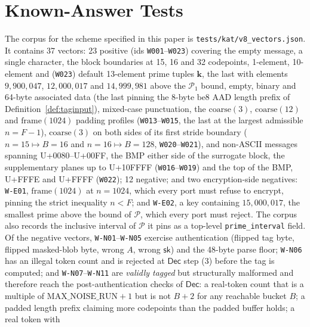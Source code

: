 \documentclass[11pt,a4paper]{article}
\begin{document}
\section{Known-Answer Tests}
\label{sec:kats}

The corpus for the scheme specified in this paper is
\texttt{tests/kat/v8\_vectors.json}. It contains 37 vectors: 23 positive
(ids \texttt{W001}--\texttt{W023}) covering the empty message, a single
character, the block boundaries at 15, 16 and 32 codepoints, 1-element,
10-element and (\texttt{W023}) default 13-element prime tuples
$\mathbf{k}$, the last with elements $9{,}900{,}047$, $12{,}000{,}017$
and $14{,}999{,}981$ above the $\mathcal{P}_1$ bound, empty, binary and 64-byte associated
data (the last pinning the 8-byte $\mathrm{be8}$ AAD length prefix of
Definition~\ref{def:taginput}), mixed-case punctuation, the
$\mathrm{coarse}(3)$, $\mathrm{coarse}(12)$ and $\mathrm{frame}(1024)$
padding profiles (\texttt{W013}--\texttt{W015}, the last at the largest
admissible $n=F-1$), $\mathrm{coarse}(3)$ on both sides of its first
stride boundary ($n=15\mapsto B=16$ and $n=16\mapsto B=128$,
\texttt{W020}--\texttt{W021}), and non-ASCII messages
spanning U+0080--U+00FF, the BMP either side of the surrogate block, the
supplementary planes up to U+10FFFF (\texttt{W016}--\texttt{W019}) and the
top of the BMP, U+FFFE and U+FFFF (\texttt{W022}); 12
negative; and two encryption-side negatives: \texttt{W-E01},
$\mathrm{frame}(1024)$ at $n=1024$, which every port must refuse to
encrypt, pinning the strict inequality $n<F$; and \texttt{W-E02}, a key
containing $15{,}000{,}017$, the smallest prime above the bound of
$\mathcal{P}$, which every port must reject. The corpus also records the
inclusive interval of $\mathcal{P}$ it pins as a top-level
\texttt{prime\_interval} field.
Of the negative vectors, \texttt{W-N01}--\texttt{W-N05} exercise
authentication (flipped tag byte, flipped masked-blob byte, wrong $A$,
wrong $\mathsf{sk}$) and the 48-byte parse floor; \texttt{W-N06} has an
illegal token count and is rejected at $\mathsf{Dec}$ step (3) before the
tag is computed; and \texttt{W-N07}--\texttt{W-N11} are \emph{validly
tagged} but structurally malformed and therefore reach the
post-authentication checks of $\mathsf{Dec}$:
a real-token count that is a multiple of $\mathrm{MAX\_NOISE\_RUN}+1$ but
is not $B+2$ for any reachable bucket $B$; a padded length prefix
claiming more codepoints than the padded buffer holds; a real token with
\end{document}
